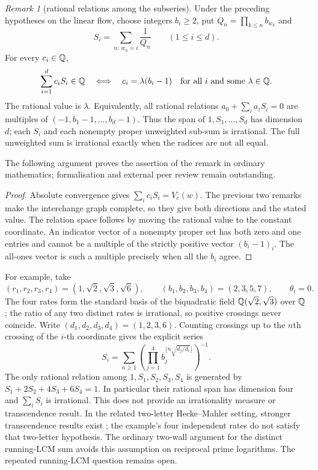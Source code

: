 \documentclass[11pt]{article}
\theoremstyle{remark}
\newtheorem{recordremark}[theorem]{Remark}
\renewenvironment{remark}[1][]{\begin{recordremark}[#1]}{\end{recordremark}}
\theoremstyle{plain}
\begin{document}
\begin{remark}[rational relations among the subseries]
\label{long269:thm:clock-relations}
Under the preceding hypotheses on the linear flow, choose integers $b_i\ge2$, put
$Q_n=\prod_{k\le n}b_{w_k}$ and
\[
 S_i=\sum_{n:\,w_n=i}\frac1{Q_n}\qquad(1\le i\le d).
\]
For every $c_i\in\mathbb{Q}$,
\[
 \sum_{i=1}^dc_iS_i\in\mathbb{Q}
 \quad\Longleftrightarrow\quad
 c_i=\lambda(b_i-1)\quad\hbox{for all $i$ and some $\lambda\in\mathbb{Q}$}.
\]
The rational value is $\lambda$.  Equivalently, all rational relations
$a_0+\sum_i a_iS_i=0$ are multiples of
$(-1,b_1-1,\ldots,b_d-1)$.  Thus the span of
$1,S_1,\ldots,S_d$ has dimension $d$; each $S_i$ and each nonempty
proper unweighted sub-sum is irrational.  The full unweighted sum is
irrational exactly when the radices are not all equal.
\end{remark}

The following argument proves the assertion of the remark in ordinary
mathematics; formalisation and external peer review remain outstanding.

\begin{proof}
Absolute convergence gives $\sum_i c_iS_i=V_c(w)$.  The previous
two remarks make the interchange graph complete, so they give both
directions and the stated value.  The relation space follows by moving
the rational value to the constant coordinate.  An indicator vector of
a nonempty proper set has both zero and one entries and cannot be a
multiple of the strictly positive vector $(b_i-1)_i$.  The all-ones
vector is such a multiple precisely when all the $b_i$ agree.
\end{proof}

For example, take
\[
 (r_1,r_2,r_3,r_4)=(1,\sqrt2,\sqrt3,\sqrt6),\qquad
 (b_1,b_2,b_3,b_4)=(2,3,5,7),\qquad \theta_i=0.
\]
The four rates form the standard basis of the biquadratic field
$\mathbb{Q}(\sqrt2,\sqrt3)$ over $\mathbb{Q}$; the ratio of any two distinct rates is
irrational, so positive crossings never coincide.  Write
$(d_1,d_2,d_3,d_4)=(1,2,3,6)$.  Counting crossings up to the $n$th
crossing of the $i$-th coordinate gives the explicit series
\begin{equation}\label{long269:eq:four-clocks}
 S_i=\sum_{n\ge1}\left(
       \prod_{j=1}^4 b_j^{\lfloor n\sqrt{d_j/d_i}\rfloor}
                        \right)^{-1}.
\end{equation}
The only rational relation among $1,S_1,S_2,S_3,S_4$ is generated by
$S_1+2S_2+4S_3+6S_4=1$.  In particular their rational span has
dimension four and $\sum_iS_i$ is irrational.  This does not provide an
irrationality measure or transcendence result.  In the related
two-letter Hecke--Mahler setting, stronger transcendence results exist
\cite{bugeaudlaurent2023}; the example's four independent rates do not
satisfy that two-letter hypothesis.  The ordinary two-wall argument for the distinct running-LCM sum avoids
this assumption on reciprocal prime logarithms.  The repeated
running-LCM question remains open.
\end{document}
